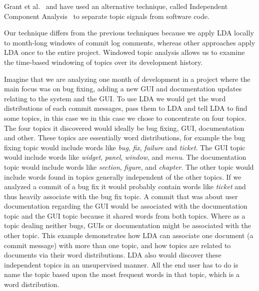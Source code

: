 \documentclass[times, 10pt,twocolumn]{article}
\begin{document}
Grant et al.~\cite{scottcordy} and have used an alternative technique,
called Independent Component Analysis~\cite{delacshort} to separate topic signals from
software code.

Our technique differs from the previous techniques because we apply
LDA locally to month-long windows of commit log comments, whereas
other approaches apply LDA once to the entire project. Windowed topic
analysis allows us to examine the time-based windowing of topics over
its development history.




Imagine that we are analyzing one month of development in a project
where the main focus was on bug fixing, adding a new GUI and
documentation updates relating to the system and the GUI. To use LDA
we would get the word distributions of each commit messages, pass them to
LDA and tell LDA to find some topics, in this case we
in this case we chose to concentrate on four topics.
 The four
topics it discovered would ideally be bug fixing, GUI, documentation
and other. These topics are essentially word distributions, for
example the bug fixing topic would include words like \emph{bug},
\emph{fix}, \emph{failure} and \emph{ticket}. The GUI topic would
include words like \emph{widget}, \emph{panel}, \emph{window}, and
\emph{menu}. The documentation topic would include words like
\emph{section}, \emph{figure}, and \emph{chapter}. The other topic
would include words found in topics generally independent of the other
topics. If we analyzed a commit of a bug fix it would probably contain
words like \emph{ticket} and thus heavily associate with the bug fix
topic. A commit that was about user documentation regarding the GUI
would be associated with the documentation topic and the GUI topic
because it shared words from both topics. Where as a topic dealing
neither bugs, GUIs or documentation might be associated with the other
topic. This example demonstrates how LDA can associate one document (a
commit message) with more than one topic, and how topics are related to
documents via their word distributions. LDA also would discover these
independent topics in an unsupervised manner. All the end user has to
do is name the topic based upon the most frequent words in that topic,
which is a word distribution.
\end{document}
